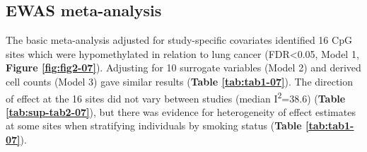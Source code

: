 \documentclass[11pt,oneside]{bristolthesis}
\begin{document}
\hypertarget{results-ewas-meta-analysis}{%
\subsection{EWAS meta-analysis}\label{results-ewas-meta-analysis}}

The basic meta-analysis adjusted for study-specific covariates identified 16 CpG sites which were hypomethylated in relation to lung cancer (FDR\textless0.05, Model 1, \textbf{Figure \ref{fig:fig2-07}}). Adjusting for 10 surrogate variables (Model 2) and derived cell counts (Model 3) gave similar results (\textbf{Table \ref{tab:tab1-07}}). The direction of effect at the 16 sites did not vary between studies (median I\textsuperscript{2}=38.6) (\textbf{Table \ref{tab:sup-tab2-07}}), but there was evidence for heterogeneity of effect estimates at some sites when stratifying individuals by smoking status (\textbf{Table \ref{tab:tab1-07}}).
\end{document}
